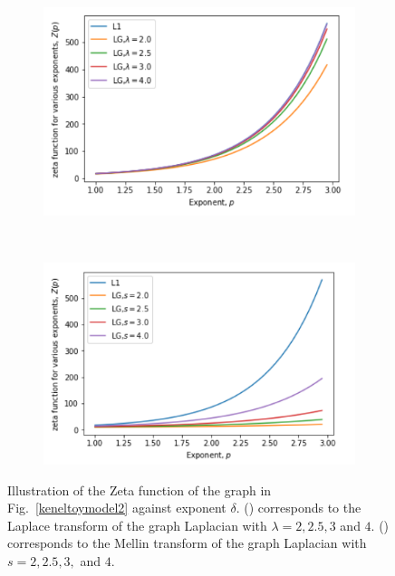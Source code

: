 \documentclass[10pt,a4paper]{article}
\begin{document}
        \begin{figure}[H]
        	\centering
        	\begin{subfigure}[b]{0.35\textwidth}
        		\includegraphics[width= \textwidth]{images/zeta-laplace2.png}
        		\caption{}
        		\label{zeta-laplace}
        	\end{subfigure}~
        	\begin{subfigure}[b]{0.35\textwidth}
        		\includegraphics[width= \textwidth]{images/zeta-mellin2.png}
        		\caption{}
        		\label{zeta-mellin}
        	\end{subfigure} 
        	\caption{Illustration of the Zeta function of the graph in Fig.~\ref{keneltoymodel2} against exponent $\delta$. () corresponds to the Laplace transform of the graph Laplacian with $\lambda = 2,2.5,3 $ and $4$. () corresponds to the Mellin transform of the graph Laplacian with $s = 2, 2.5, 3,$ and $4$. }
        	\label{}
        \end{figure}
    
\end{document}
